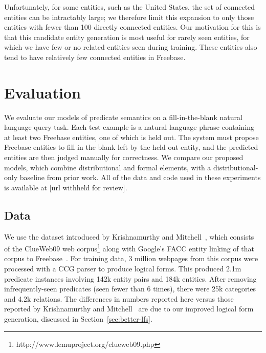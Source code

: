 \documentclass[11pt]{article}
\newcommand{\secref}[1]{Section~\ref{sec:#1}}
\begin{document}

Unfortunately, for some entities, such as the United States, the set
of connected entities can be intractably large; we therefore limit
this expansion to only those entities with fewer than 100 directly
connected entities.  Our motivation for this is that this candidate
entity generation is most useful for rarely seen entities, for which
we have few or no related entities seen during training.  These
entities also tend to have relatively few connected entities in
Freebase.

\section{Evaluation}
\label{sec:evaluation}

We evaluate our models of predicate semantics on a fill-in-the-blank
natural language query task.  Each test example is a natural language
phrase containing at least two Freebase entities, one of which is held
out.  The system must propose Freebase entities to fill in the blank
left by the held out entity, and the predicted entities are then
judged manually for correctness.  We compare our proposed models,
which combine distributional and formal elements, with a
distributional-only baseline from prior work.  All of the data and
code used in these experiments is available at [url withheld for
review].

\subsection{Data}

We use the dataset introduced by Krishnamurthy and
Mitchell~,
which consists of the ClueWeb09 web
corpus\footnote{http://www.lemuproject.org/clueweb09.php} along with
Google's FACC entity linking of that corpus to
Freebase~\cite{gabrilovich-2013-clueweb-entity-linking}.  For training
data, 3 million webpages from this corpus were processed with a CCG
parser to produce logical forms.  This produced 2.1m predicate
instances involving 142k entity pairs and 184k entities.  After
removing infrequently-seen predicates (seen fewer than 6 times), there
were 25k categories and 4.2k relations.  The differences in numbers
reported here versus those reported by Krishnamurthy and
Mitchell~ are
due to our improved logical form generation, discussed in
\secref{better-lfs}.
\end{document}
